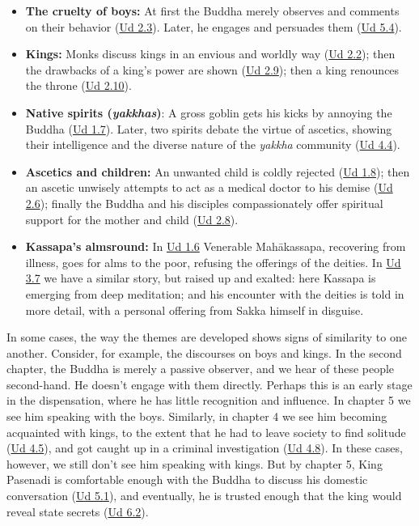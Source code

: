 \documentclass[12pt,openany]{book}%
\begin{document}
\begin{itemize}%
\item \textbf{The cruelty of boys:} At first the Buddha merely observes and comments on their behavior (\href{https://suttacentral.net/ud2.3/en/sujato}{Ud 2.3}). Later, he engages and persuades them (\href{https://suttacentral.net/ud5.4/en/sujato}{Ud 5.4}).%
\item \textbf{Kings:} Monks discuss kings in an envious and worldly way (\href{https://suttacentral.net/ud2.2/en/sujato}{Ud 2.2}); then the drawbacks of a king’s power are shown (\href{https://suttacentral.net/ud2.9/en/sujato}{Ud 2.9}); then a king renounces the throne (\href{https://suttacentral.net/ud2.10/en/sujato}{Ud 2.10}).%
\item \textbf{Native spirits (\textit{yakkhas})}: A gross goblin gets his kicks by annoying the Buddha (\href{https://suttacentral.net/ud1.7/en/sujato}{Ud 1.7}). Later, two spirits debate the virtue of ascetics, showing their intelligence and the diverse nature of the \textit{yakkha} community (\href{https://suttacentral.net/ud4.4/en/sujato}{Ud 4.4}).%
\item \textbf{Ascetics and children:} An unwanted child is coldly rejected (\href{https://suttacentral.net/ud1.8/en/sujato}{Ud 1.8}); then an ascetic unwisely attempts to act as a medical doctor to his demise (\href{https://suttacentral.net/ud2.6/en/sujato}{Ud 2.6}); finally the Buddha and his disciples compassionately offer spiritual support for the mother and child (\href{https://suttacentral.net/ud2.8/en/sujato}{Ud 2.8}).%
\item \textbf{Kassapa’s almsround:} In \href{https://suttacentral.net/ud1.6/en/sujato}{Ud 1.6}  Venerable \textsanskrit{Mahākassapa}, recovering from illness, goes for alms to the poor, refusing the offerings of the deities. In \href{https://suttacentral.net/ud3.7/en/sujato}{Ud 3.7}  we have a similar story, but raised up and exalted: here Kassapa is emerging from deep meditation; and his encounter with the deities is told in more detail, with a personal offering from Sakka himself in disguise.%
\end{itemize}

In some cases, the way the themes are developed shows signs of similarity to one another. Consider, for example, the discourses on boys and kings. In the second chapter, the Buddha is merely a passive observer, and we hear of these people second-hand. He doesn’t engage with them directly. Perhaps this is an early stage in the dispensation, where he has little recognition and influence. In chapter 5 we see him speaking with the boys. Similarly, in chapter 4 we see him becoming acquainted with kings, to the extent that he had to leave society to find solitude (\href{https://suttacentral.net/ud4.5/en/sujato}{Ud 4.5}), and got caught up in a criminal investigation (\href{https://suttacentral.net/ud4.8/en/sujato}{Ud 4.8}). In these cases, however, we still don’t see him speaking with kings. But by chapter 5, King Pasenadi is comfortable enough with the Buddha to discuss his domestic conversation (\href{https://suttacentral.net/ud5.1/en/sujato}{Ud 5.1}), and eventually, he is trusted enough that the king would reveal state secrets (\href{https://suttacentral.net/ud6.2/en/sujato}{Ud 6.2}). 
\end{document}
